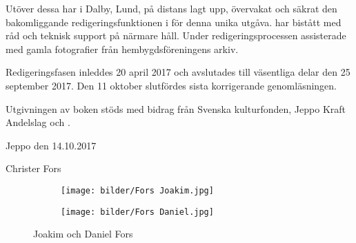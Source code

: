 Utöver dessa har  i Dalby, Lund, på distans lagt upp, övervakat och säkrat den bakomliggande redigeringsfunktionen i  \XeLaTeX  för denna unika utgåva.  har bistått med råd och teknisk support på närmare håll. Under redigeringsprocessen assisterade  med gamla fotografier från hembygdsföreningens arkiv.

Redigeringsfasen inleddes 20 april 2017 och avslutades till väsentliga delar den 25 september 2017. Den 11 oktober slutfördes sista korrigerande genomläsningen.

Utgivningen av boken stöds med bidrag från Svenska kulturfonden, Jeppo Kraft Andelslag och .

Jeppo den 14.10.2017

Christer Fors



\begin{figure}
  \centering
  \begin{subfigure}{0.49\textwidth}
    \centering
    \texttt{[image: bilder/Fors Joakim.jpg]}
  \end{subfigure}
  \begin{subfigure}{0.49\textwidth}
    \centering
    \texttt{[image: bilder/Fors Daniel.jpg]}
  \end{subfigure}
  \caption{Joakim och Daniel Fors}
\end{figure}
